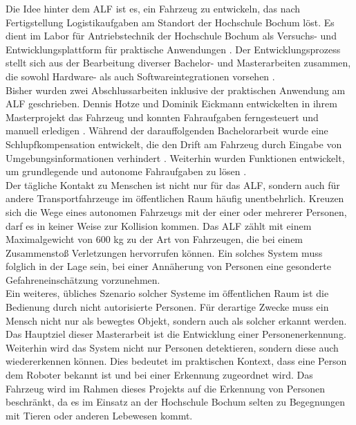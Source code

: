 		Die Idee hinter dem ALF ist es, ein Fahrzeug zu entwickeln, das nach Fertigstellung Logistikaufgaben am Standort der Hochschule Bochum löst. Es dient im Labor für Antriebstechnik der Hochschule Bochum als Versuchs- und Entwicklungsplattform für praktische Anwendungen \cite{Bachelorarbeit}. Der Entwicklungsprozess stellt sich aus der Bearbeitung diverser Bachelor- und Masterarbeiten zusammen, die sowohl Hardware- als auch Softwareintegrationen vorsehen \cite{Bachelorarbeit}.\\
		
		Bisher wurden zwei Abschlussarbeiten inklusive der praktischen Anwendung am ALF geschrieben. Dennis Hotze und Dominik Eickmann entwickelten in ihrem Masterprojekt das Fahrzeug und konnten Fahraufgaben ferngesteuert und manuell erledigen \cite{alf}. Während der darauffolgenden Bachelorarbeit wurde eine Schlupfkompensation entwickelt, die den Drift am Fahrzeug durch Eingabe von Umgebungsinformationen verhindert \cite{Bachelorarbeit}. Weiterhin wurden Funktionen entwickelt, um grundlegende und autonome Fahraufgaben zu lösen \cite{Bachelorarbeit}.\\
		
		Der tägliche Kontakt zu Menschen ist nicht nur für das ALF, sondern auch für andere Transportfahrzeuge im öffentlichen Raum häufig unentbehrlich. Kreuzen sich die Wege eines autonomen Fahrzeugs mit der einer oder mehrerer Personen, darf es in keiner Weise zur Kollision kommen. Das ALF zählt mit einem Maximalgewicht von 600 kg zu der Art von Fahrzeugen, die bei einem Zusammenstoß Verletzungen hervorrufen können. Ein solches System muss folglich in der Lage sein, bei einer Annäherung von Personen eine gesonderte Gefahreneinschätzung vorzunehmen.\\
				
		Ein weiteres, übliches Szenario solcher Systeme im öffentlichen Raum ist die Bedienung durch nicht autorisierte Personen. Für derartige Zwecke muss ein Mensch nicht nur als bewegtes Objekt, sondern auch als solcher erkannt werden. Das Hauptziel dieser Masterarbeit ist die Entwicklung einer Personenerkennung.\\
		
		Weiterhin wird das System nicht nur Personen detektieren, sondern diese auch wiedererkennen können. Dies bedeutet im praktischen Kontext, dass eine Person dem Roboter bekannt ist und bei einer Erkennung zugeordnet wird. Das Fahrzeug wird im Rahmen dieses Projekts auf die Erkennung von Personen beschränkt, da es im Einsatz an der Hochschule Bochum selten zu Begegnungen mit Tieren oder anderen Lebewesen kommt.\\
				

